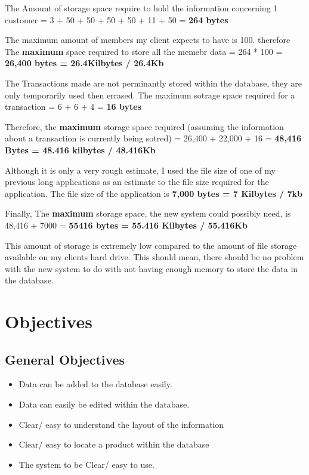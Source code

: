 \begin{flushleft}
The Amount of storage space require to hold the information concerning 1 customer = 3 + 50 + 50 + 50 + 50 + 11 + 50 = \textbf{264 bytes} \par

The maximum amount of members my client expects to have is 100. therefore The \textbf{maximum} space required to store all the memebr data = 264 * 100 = \textbf{26,400 bytes = 26.4Kilbytes / 26.4Kb} 

The Transactions made are not perminantly stored within the database, they are only temporarily used then errased. The maximum sotrage space required for a transaction = 6 + 6 + 4 = \textbf{16 bytes}


Therefore, the \textbf{maximum} storage space required (assuming the information about a transaction is currently being sotred) = 26,400 + 22,000 + 16 = \textbf{48,416 Bytes = 48.416 kilbytes / 48.416Kb}

Although it is only a very rough estimate, I used the file size of one of my previous long applications as an estimate to the file size required for the application. The file size of the application is \textbf{7,000 bytes = 7 Kilbytes / 7kb}

Finally, The \textbf{maximum} storage space, the new system could possibly need, is 48,416 + 7000 = \textbf{55416 bytes = 55.416 Kilbytes / 55.416Kb}


This amount of storage is extremely low compared to the amount of file storage available on my clients hard drive. This should mean, there should be no problem with the new system to do with not having enough memory to store the data in the database.
\end{flushleft}

\section{Objectives}

\subsection{General Objectives}

\begin{flushleft}
\begin{itemize}
\label{ref:objectives}
\item Data can be added to the database easily.
\item Data can easily be edited within the database.
\item Clear/ easy to understand the layout of the information
\item Clear/ easy to locate a product within the database
\item The system to be Clear/ easy to use.
\end{itemize}
\end{flushleft} 


